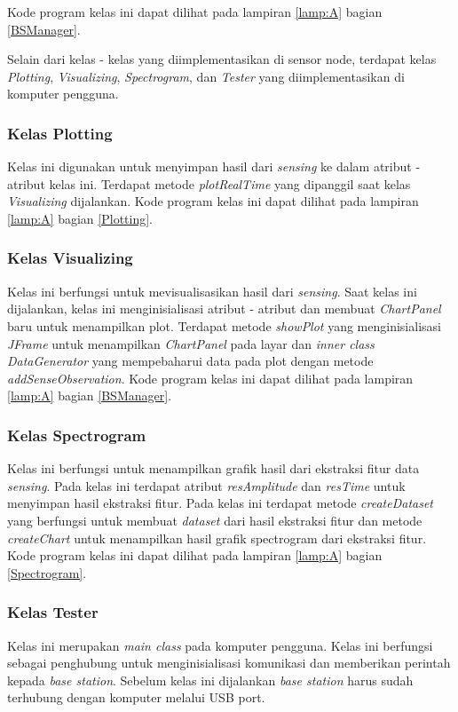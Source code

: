 Kode program kelas ini dapat dilihat pada lampiran \ref{lamp:A} bagian \ref{BSManager}.
 
Selain dari kelas - kelas yang diimplementasikan di sensor node, terdapat kelas {\it Plotting}, {\it Visualizing}, {\it Spectrogram}, dan {\it Tester} yang diimplementasikan di komputer pengguna.

\subsubsection{Kelas Plotting}
Kelas ini digunakan untuk menyimpan hasil dari {\it sensing} ke dalam atribut - atribut kelas ini. Terdapat metode {\it plotRealTime} yang dipanggil saat kelas {\it Visualizing} dijalankan. Kode program kelas ini dapat dilihat pada lampiran \ref{lamp:A} bagian \ref{Plotting}.

\subsubsection{Kelas Visualizing}
Kelas ini berfungsi untuk mevisualisasikan hasil dari {\it sensing}. Saat kelas ini dijalankan, kelas ini menginisialisasi atribut - atribut dan membuat {\it ChartPanel} baru untuk menampilkan plot. Terdapat metode {\it showPlot} yang menginisialisasi {\it JFrame} untuk menampilkan {\it ChartPanel} pada layar dan {\it inner class DataGenerator} yang mempebaharui data pada plot dengan metode {\it addSenseObservation}. Kode program kelas ini dapat dilihat pada lampiran \ref{lamp:A} bagian \ref{BSManager}.

\subsubsection{Kelas Spectrogram}
Kelas ini berfungsi untuk menampilkan grafik hasil dari ekstraksi fitur data {\it sensing}. Pada kelas ini terdapat atribut {\it resAmplitude} dan {\it resTime} untuk menyimpan hasil ekstraksi fitur. Pada kelas ini terdapat metode {\it createDataset} yang berfungsi untuk membuat {\it dataset} dari hasil ekstraksi fitur dan metode {\it createChart} untuk menampilkan hasil grafik spectrogram dari ekstraksi fitur. Kode program kelas ini dapat dilihat pada lampiran \ref{lamp:A} bagian \ref{Spectrogram}.

\subsubsection{Kelas Tester}
Kelas ini merupakan {\it main class} pada komputer pengguna. Kelas ini berfungsi sebagai penghubung untuk menginisialisasi komunikasi dan memberikan perintah kepada {\it base station}. Sebelum kelas ini dijalankan {\it base station} harus sudah terhubung dengan komputer melalui USB port.

